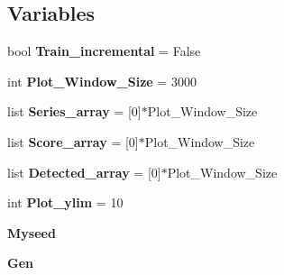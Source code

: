 \subsection*{Variables}
\begin{DoxyCompactItemize}
\item 
bool {\bfseries Train\+\_\+incremental} = False\hypertarget{namespaceSAD_1_1Main__Timestamp_a011586e83c3a13cad8dc17bb9d084619}{}\label{namespaceSAD_1_1Main__Timestamp_a011586e83c3a13cad8dc17bb9d084619}

\item 
int {\bfseries Plot\+\_\+\+Window\+\_\+\+Size} = 3000\hypertarget{namespaceSAD_1_1Main__Timestamp_a61708b02a3c167225c59ac0f61724daa}{}\label{namespaceSAD_1_1Main__Timestamp_a61708b02a3c167225c59ac0f61724daa}

\item 
list {\bfseries Series\+\_\+array} = \mbox{[}0\mbox{]}$\ast$Plot\+\_\+\+Window\+\_\+\+Size\hypertarget{namespaceSAD_1_1Main__Timestamp_a618ae9c7f9cff5df67f8072c312b70da}{}\label{namespaceSAD_1_1Main__Timestamp_a618ae9c7f9cff5df67f8072c312b70da}

\item 
list {\bfseries Score\+\_\+array} = \mbox{[}0\mbox{]}$\ast$Plot\+\_\+\+Window\+\_\+\+Size\hypertarget{namespaceSAD_1_1Main__Timestamp_ab8dcf18772ce1ad9aefcbc88900190ef}{}\label{namespaceSAD_1_1Main__Timestamp_ab8dcf18772ce1ad9aefcbc88900190ef}

\item 
list {\bfseries Detected\+\_\+array} = \mbox{[}0\mbox{]}$\ast$Plot\+\_\+\+Window\+\_\+\+Size\hypertarget{namespaceSAD_1_1Main__Timestamp_a26ab78ba983e3b8a9181939d755c8f81}{}\label{namespaceSAD_1_1Main__Timestamp_a26ab78ba983e3b8a9181939d755c8f81}

\item 
int {\bfseries Plot\+\_\+ylim} = 10\hypertarget{namespaceSAD_1_1Main__Timestamp_a8f503ba9b37038ac3115c4c612cf4718}{}\label{namespaceSAD_1_1Main__Timestamp_a8f503ba9b37038ac3115c4c612cf4718}

\item 
{\bfseries Myseed}\hypertarget{namespaceSAD_1_1Main__Timestamp_af74b9006194892ca3a9c95d30cc5ff86}{}\label{namespaceSAD_1_1Main__Timestamp_af74b9006194892ca3a9c95d30cc5ff86}

\item 
{\bfseries Gen}\hypertarget{namespaceSAD_1_1Main__Timestamp_a88eb3a987cf00bd45598ec9c57b2e991}{}\label{namespaceSAD_1_1Main__Timestamp_a88eb3a987cf00bd45598ec9c57b2e991}


\end{DoxyCompactItemize}
